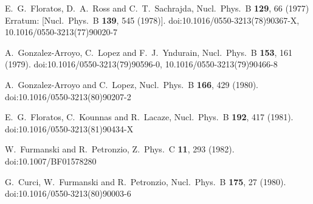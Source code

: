 \documentclass[review]{elsarticle}
\begin{document}
\begin{thebibliography}{}
  E.~G.~Floratos, D.~A.~Ross and C.~T.~Sachrajda,
  Nucl.\ Phys.\ B {\bf 129}, 66 (1977)
  Erratum: [Nucl.\ Phys.\ B {\bf 139}, 545 (1978)].
  doi:10.1016/0550-3213(78)90367-X, 10.1016/0550-3213(77)90020-7


  A.~Gonzalez-Arroyo, C.~Lopez and F.~J.~Yndurain,
  Nucl.\ Phys.\ B {\bf 153}, 161 (1979).
  doi:10.1016/0550-3213(79)90596-0, 10.1016/0550-3213(79)90466-8


  A.~Gonzalez-Arroyo and C.~Lopez,
  Nucl.\ Phys.\ B {\bf 166}, 429 (1980).
  doi:10.1016/0550-3213(80)90207-2


  E.~G.~Floratos, C.~Kounnas and R.~Lacaze,
  Nucl.\ Phys.\ B {\bf 192}, 417 (1981).
  doi:10.1016/0550-3213(81)90434-X
  

  W.~Furmanski and R.~Petronzio,
  Z.\ Phys.\ C {\bf 11}, 293 (1982).
  doi:10.1007/BF01578280


  G.~Curci, W.~Furmanski and R.~Petronzio,
  Nucl.\ Phys.\ B {\bf 175}, 27 (1980).
  doi:10.1016/0550-3213(80)90003-6
  

\end{thebibliography}
\end{document}
